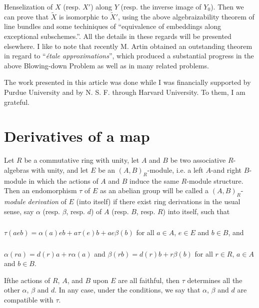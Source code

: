 Henselization of $X$ (resp. $X'$) along $Y$ (resp. the inverse image of $Y_{0}$). Then we can prove that $\widetilde{X}$ is isomorphic to $\widetilde{X}'$, using the above algebraizability theorem of line bundles and some techiniques of ``equivalence of embeddings along exceptional subschemes.''. All the details in these regards will be presented elsewhere. I like to note that recently M. Artin obtained an outstanding theorem in regard to ``{\em \'etale approximations}'', which produced a substantial progress in the above Blowing-down Problem as well as in many related problems.

The work presented in this article was done while I was financially supported by Purdue University and by N. S. F. through Harvard University. To them, I am grateful.

\section{Derivatives of a map}\label{art10-sec1}

Let $R$ be a commutative ring with unity, let $A$ and $B$ be two associative $R$-algebras with unity, and let $E$ be an $(A,B)_{R}$-module, i.e. a left $A$-and right $B$-module in which the actions of $A$ and $B$ induce the same $R$-module structure. Then an endomorphism $\tau$ of $E$ as an abelian group will be called a $(A,B)_{R}$-{\em module derivation} of $E$ (into itself) if there exist ring derivations in the usual sense, say $\alpha$ (resp. $\beta$, resp. $d$) of $A$ (resp. $B$, resp. $R$) into itself, such that

\setcounter{subsection}{1}
\subsubsection{}\label{art10-sec1.1.1} $\tau(aeb)=\alpha(a)eb+a\tau(e)b+ae\beta(b)$ for all $a\in A$, $e\in E$ and $b\in B$, and

\subsubsection{}\label{art10-sec1.1.2} $\alpha(ra)=d(r)a+r\alpha(a)$ and $\beta(rb)=d(r)b+r\beta(b)$ for all $r\in R$, $a\in A$ and $b\in B$.

\setcounter{theorem}{1}
\begin{remark}\label{art10-sec1-rem1.2}
If\pageoriginale the actions of $R$, $A$, and $B$ upon $E$ are all faithful, then $\tau$ determines all the other $\alpha$, $\beta$ and $d$. In any case, under the conditions, we say that $\alpha$, $\beta$ and $d$ are compatible with $\tau$.
\end{remark}

